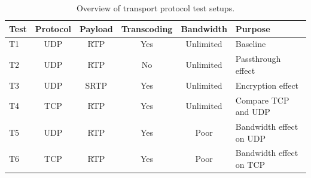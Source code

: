 \begin{table}[H]
    \centering
    \caption{Overview of transport protocol test setups.}
    \label{tab:transport_overview}
    \begin{tabular}{@{}lccccl@{}}
        \toprule
        \textbf{Test} & \textbf{Protocol} & \textbf{Payload} & \textbf{Transcoding} & \textbf{Bandwidth} & \textbf{Purpose} \\
        \midrule
        T1 & UDP & RTP  & Yes & Unlimited & Baseline \\
        T2 & UDP & RTP  & No  & Unlimited & Passthrough effect \\
        T3 & UDP & SRTP & Yes & Unlimited & Encryption effect \\
        T4 & TCP & RTP  & Yes & Unlimited & Compare TCP and UDP \\
        T5 & UDP & RTP  & Yes & Poor      & Bandwidth effect on UDP \\
        T6 & TCP & RTP  & Yes & Poor      & Bandwidth effect on TCP \\
        \bottomrule
    \end{tabular}
\end{table}